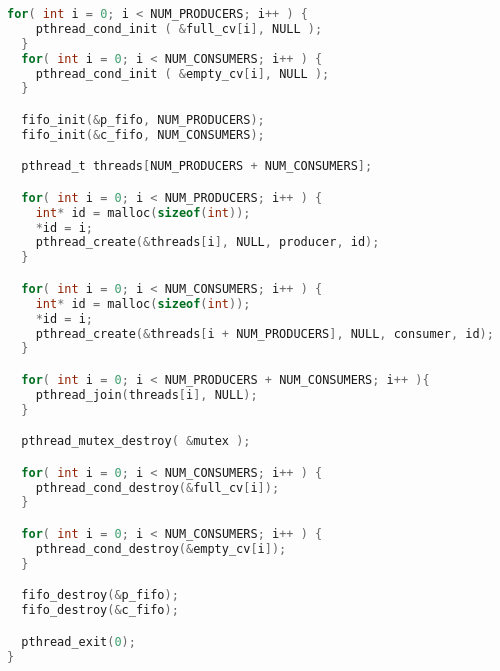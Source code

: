 \begin{lstlisting}[language=C]
  for( int i = 0; i < NUM_PRODUCERS; i++ ) {
    pthread_cond_init ( &full_cv[i], NULL );
  }
  for( int i = 0; i < NUM_CONSUMERS; i++ ) {
    pthread_cond_init ( &empty_cv[i], NULL );
  }

  fifo_init(&p_fifo, NUM_PRODUCERS);
  fifo_init(&c_fifo, NUM_CONSUMERS);

  pthread_t threads[NUM_PRODUCERS + NUM_CONSUMERS];

  for( int i = 0; i < NUM_PRODUCERS; i++ ) {
    int* id = malloc(sizeof(int));
    *id = i;
    pthread_create(&threads[i], NULL, producer, id);
  }

  for( int i = 0; i < NUM_CONSUMERS; i++ ) {
    int* id = malloc(sizeof(int));
    *id = i;
    pthread_create(&threads[i + NUM_PRODUCERS], NULL, consumer, id);
  }

  for( int i = 0; i < NUM_PRODUCERS + NUM_CONSUMERS; i++ ){
    pthread_join(threads[i], NULL);
  }

  pthread_mutex_destroy( &mutex );

  for( int i = 0; i < NUM_CONSUMERS; i++ ) {
    pthread_cond_destroy(&full_cv[i]);
  }

  for( int i = 0; i < NUM_CONSUMERS; i++ ) {
    pthread_cond_destroy(&empty_cv[i]);
  }

  fifo_destroy(&p_fifo);
  fifo_destroy(&c_fifo);

  pthread_exit(0);
}
\end{lstlisting}




